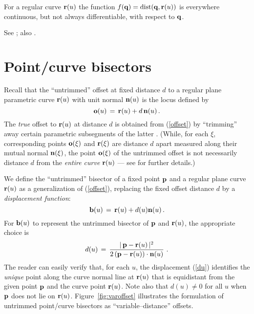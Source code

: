 \begin{propn} {\rm
For a regular curve ${\bf r}(u)$ the function $f({\bf q})=
{\rm dist}({\bf q},{\bf r}(u))$ is everywhere continuous, but
not always differentiable, with respect to ${\bf q}$. }
\end{propn}

\prf See \cite[Proposition~1.2]{farouki91}; also \cite{kelly79}.
\QED

\section{Point/curve bisectors}

Recall \cite{farouki90a,farouki90b} that the ``untrimmed'' offset
at fixed distance $d$ to a regular plane parametric curve ${\bf r}
(u)$ with unit normal ${\bf n}(u)$ is the locus defined by
\begin{equation} \label{offset}
{\bf o}(u) \,=\, {\bf r}(u) + d\,{\bf n}(u) \,.
\end{equation}
The {\it true\/} offset to ${\bf r}(u)$ at distance $d$ is
obtained from (\ref{offset}) by ``trimming'' away certain parametric
subsegments of the latter \cite{farouki90a,farouki90b}. (While, for
each $\xi$, corresponding points ${\bf o}(\xi)$ and ${\bf r}(\xi)$
are distance $d$ apart measured along their mutual normal ${\bf n}
(\xi)$, the point ${\bf o}(\xi)$ of the untrimmed offset is not
necessarily distance $d$ from the {\it entire curve\/} ${\bf r}(u)$
--- see \cite{farouki90a,farouki90b} for further details.)

We define the ``untrimmed'' bisector of a fixed point ${\bf p}$
and a regular plane curve ${\bf r}(u)$ as a generalization of
(\ref{offset}), replacing the fixed offset distance $d$ by a
{\it displacement function\/}:
\begin{equation} \label{varoffset}
{\bf b}(u) \,=\, {\bf r}(u) + d(u) {\bf n}(u) \,.
\end{equation}
For ${\bf b}(u)$ to represent the untrimmed bisector of ${\bf p}$
and ${\bf r}(u)$, the appropriate choice is
\begin{equation} \label{du}
d(u) \,=\, {|\,{\bf p}-{\bf r}(u)\,|^2 \over
2\,({\bf p}-{\bf r}(u))\cdot{\bf n}(u)} \,\,.
\end{equation}
The reader can easily verify that, for each $u$, the displacement
(\ref{du}) identifies the {\it unique\/} point along the curve normal
line at ${\bf r}(u)$ that is equidistant from the given point ${\bf p}$
and the curve point ${\bf r}(u)$. Note also that $d(u)\not=0$ for all
$u$ when ${\bf p}$ does not lie on ${\bf r}(u)$.
Figure~\ref{fig:varoffset} illustrates the formulation of untrimmed
point/curve bisectors as ``variable--distance'' offsets.

